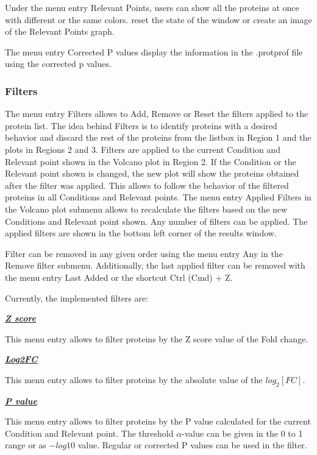 Under the menu entry Relevant Points, users can show all the proteins at once with different or the same colors. reset the state of the window or create an image of the Relevant Points graph.

The menu entry Corrected P values display the information in the .protprof file using the corrected p values.

\subsubsection{Filters}

The menu entry Filters allows to Add, Remove or Reset the filters applied to the protein list. The idea behind Filters is to identify proteins with a desired behavior and discard the rest of the proteins from the listbox in Region \num{1} and the plots in Regions \num{2} and \num{3}. Filters are applied to the current Condition and Relevant point shown in the Volcano plot in Region \num{2}. If the Condition or the Relevant point shown is changed, the new plot will show the proteins obtained after the filter was applied. This allows to follow the behavior of the filtered proteins in all Conditions and Relevant points. The menu entry Applied Filters in the Volcano plot submenu allows to recalculate the filters based on the new Conditions and Relevant point shown. Any number of filters can be applied. The applied filters are shown in the bottom left corner of the results window. 

Filter can be removed in any given order using the menu entry Any in the Remove filter submenu. Additionally, the last applied filter can be removed with the menu entry Last Added or the shortcut Ctrl (Cmd) + Z.

Currently, the implemented filters are:

\textbf{\textit{\underline{Z score}}}

This menu entry allows to filter proteins by the Z score value of the Fold change. 

\textbf{\textit{\underline{Log2FC}}}

This menu entry allows to filter proteins by the absolute value of the $log_2[FC]$. 

\textbf{\textit{\underline{P value}}}

This menu entry allows to filter proteins by the P value calculated for the current Condition and Relevant point. The threshold $\alpha$-value can be given in the 0 to 1 range or as $-log10$ value. Regular or corrected P values can be used in the filter.

